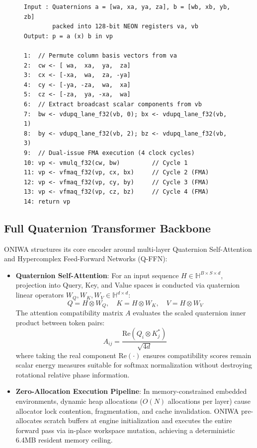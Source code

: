 \documentclass[10pt,twocolumn,letterpaper]{article}
\begin{document}
\begin{figure}[htbp]
\centering
\begin{minipage}{0.98\columnwidth}
\begin{lstlisting}[caption={ARM NEON 4-Cycle SIMD Hamilton Product.}, label={alg:simd_hamilton}]
Input : Quaternions a = [wa, xa, ya, za], b = [wb, xb, yb, zb]
        packed into 128-bit NEON registers va, vb
Output: p = a (x) b in vp

1:  // Permute column basis vectors from va
2:  cw <- [ wa,  xa,  ya,  za]
3:  cx <- [-xa,  wa,  za, -ya]
4:  cy <- [-ya, -za,  wa,  xa]
5:  cz <- [-za,  ya, -xa,  wa]
6:  // Extract broadcast scalar components from vb
7:  bw <- vdupq_lane_f32(vb, 0); bx <- vdupq_lane_f32(vb, 1)
8:  by <- vdupq_lane_f32(vb, 2); bz <- vdupq_lane_f32(vb, 3)
9:  // Dual-issue FMA execution (4 clock cycles)
10: vp <- vmulq_f32(cw, bw)         // Cycle 1
11: vp <- vfmaq_f32(vp, cx, bx)     // Cycle 2 (FMA)
12: vp <- vfmaq_f32(vp, cy, by)     // Cycle 3 (FMA)
13: vp <- vfmaq_f32(vp, cz, bz)     // Cycle 4 (FMA)
14: return vp
\end{lstlisting}
\end{minipage}
\end{figure}


\subsection{Full Quaternion Transformer Backbone}
ONIWA structures its core encoder around multi-layer Quaternion Self-Attention and Hypercomplex Feed-Forward Networks (Q-FFN):
\begin{itemize}
    \item \textbf{Quaternion Self-Attention}: For an input sequence $H \in \mathbb{H}^{B \times S \times d}$, projection into Query, Key, and Value spaces is conducted via quaternion linear operators $W_Q, W_K, W_V \in \mathbb{H}^{d \times d}$:
    \begin{equation}
    Q = H \otimes W_Q, \quad K = H \otimes W_K, \quad V = H \otimes W_V
    \end{equation}
    The attention compatibility matrix $A$ evaluates the scaled quaternion inner product between token pairs:
    \begin{equation}
    A_{ij} = \frac{\text{Re}(Q_i \otimes K_j^*)}{\sqrt{4d}}
    \end{equation}
    where taking the real component $\text{Re}(\cdot)$ ensures compatibility scores remain scalar energy measures suitable for softmax normalization without destroying rotational relative phase information.
    \item \textbf{Zero-Allocation Execution Pipeline}: In memory-constrained embedded environments, dynamic heap allocations ($O(N)$ allocations per layer) cause allocator lock contention, fragmentation, and cache invalidation. ONIWA pre-allocates scratch buffers at engine initialization and executes the entire forward pass via in-place workspace mutation, achieving a deterministic 6.4MB resident memory ceiling.
\end{itemize}
\end{document}

